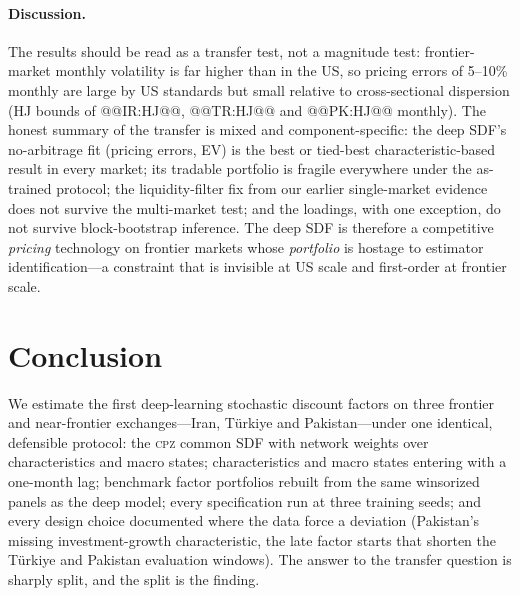 \documentclass[12pt]{article}
\begin{document}
\paragraph{Discussion.} The results should be read as a transfer test, not a magnitude test: frontier-market monthly volatility is far higher than in the US, so pricing errors of 5--10\% monthly are large by US standards but small relative to cross-sectional dispersion (HJ bounds of @@IR:HJ@@, @@TR:HJ@@ and @@PK:HJ@@ monthly). The honest summary of the transfer is mixed and component-specific: the deep SDF's no-arbitrage fit (pricing errors, EV) is the best or tied-best characteristic-based result in every market; its tradable portfolio is fragile everywhere under the as-trained protocol; the liquidity-filter fix from our earlier single-market evidence does not survive the multi-market test; and the loadings, with one exception, do not survive block-bootstrap inference. The deep SDF is therefore a competitive \emph{pricing} technology on frontier markets whose \emph{portfolio} is hostage to estimator identification---a constraint that is invisible at US scale and first-order at frontier scale.

\section{Conclusion}\label{sec:concl}

We estimate the first deep-learning stochastic discount factors on three frontier and near-frontier exchanges---Iran, T\"urkiye and Pakistan---under one identical, defensible protocol: the \textsc{cpz} common SDF with network weights over characteristics and macro states; characteristics and macro states entering with a one-month lag; benchmark factor portfolios rebuilt from the same winsorized panels as the deep model; every specification run at three training seeds; and every design choice documented where the data force a deviation (Pakistan's missing investment-growth characteristic, the late factor starts that shorten the T\"urkiye and Pakistan evaluation windows). The answer to the transfer question is sharply split, and the split is the finding.
\end{document}
